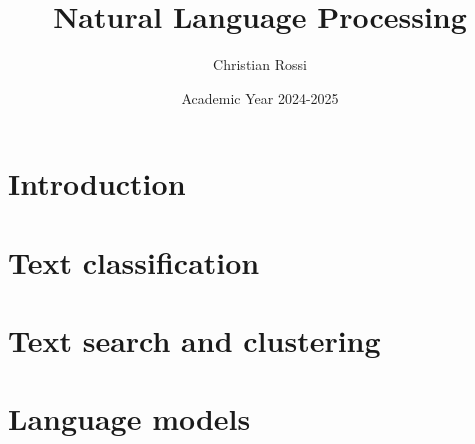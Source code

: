 \documentclass[12pt, a4paper]{report}
\title{\textbf{Natural Language Processing}}
\author{Christian Rossi}
\date{Academic Year 2024-2025}
\begin{document}
    \maketitle

    

    \cleardoublepage{}

    \tableofcontents

    \cleardoublepage{}

    \chapter{Introduction}
    
    
    

    \chapter{Text classification}
    
    
    
    

    \chapter{Text search and clustering}
    
    
    
    
    
    

    \chapter{Language models}
    
    
\end{document}
